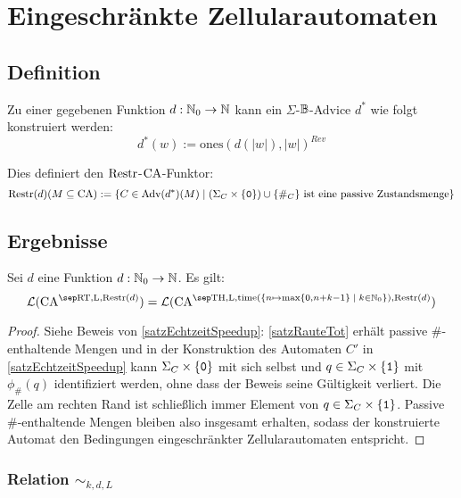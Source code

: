 \chapter{Eingeschränkte Zellularautomaten}
\label{chap:EingeschrAuto}

\section{Definition}

\begin{definition}
    Zu einer gegebenen Funktion $d: \mathbb{N}_0 \to \mathbb{N}$ kann ein $\Sigma$-$\mathbb{B}$-Advice $d^*$ wie folgt konstruiert werden:
    \[
        d^*(w) := \mathrm{ones}(d(|w|), |w|)^{Rev}
    \]        

    Dies definiert den $\mathrm{Restr}$-$\textrm{CA}$-Funktor:
    \[
        \mathrm{Restr}(d)(M \subseteq \textrm{CA}) := \{ { C \in \textrm{Adv}(d^*)(M) } \; | \; { (\Sigma_C \times \{ { \texttt{0} } \}) \cup \{ { \#_C } \} \text{ ist eine passive Zustandsmenge} } \}
    \]
\end{definition}

\section{Ergebnisse}

\begin{satz}
    \label{satzEingeschraenktEchtzeitSpeedup}
    Sei $d$ eine Funktion $d: \mathbb{N}_0 \to \mathbb{N}$. Es gilt:
    \[
        \CAL{\CART, \CALeft, \CARestr(d)} = \CAL{\CAT, \CALeft, \mathrm{time}(\set{ n \mapsto \max \finset{0,  n + k - 1} }{ k \in \Nz }), \CARestr(d)}
    \]
\end{satz}
\begin{proof}
    Siehe Beweis von \cref{satzEchtzeitSpeedup}:
    \cref{satzRauteTot} erhält passive \#-enthaltende Mengen und 
    in der Konstruktion des Automaten $C'$ in \cref{satzEchtzeitSpeedup}
    kann $\Sigma_C \times \{ {\texttt{0}} \}$ mit sich selbst und
    $q \in \Sigma_C \times \{ {\texttt{1}} \}$ mit $\phi_{\#}(q)$ identifiziert werden, ohne dass der Beweis seine Gültigkeit verliert.
    Die Zelle am rechten Rand ist schließlich immer Element von $q \in \Sigma_C \times \{ {\texttt{1}} \}$.
    Passive \#-enthaltende Mengen bleiben also insgesamt erhalten, sodass der konstruierte Automat
    den Bedingungen eingeschränkter Zellularautomaten entspricht.
\end{proof}

\subsection{Relation \texorpdfstring{$\sim_{k,d,L}$}{sim_kdL}}

